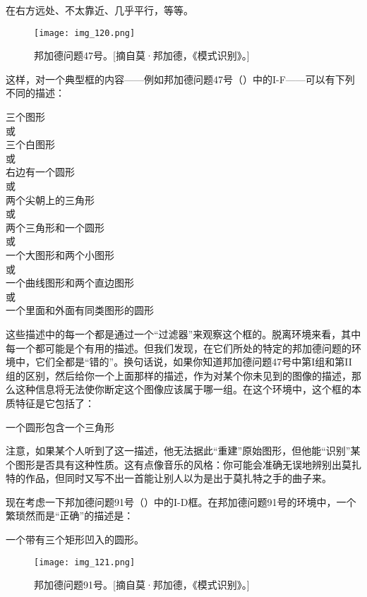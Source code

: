 \begin{block}
在右方远处、不太靠近、几乎平行，等等。
\end{block}

\begin{figure}
\texttt{[image: img\_120.png]}
\caption[邦加德问题47号。]
  {邦加德问题47号。[摘自莫·邦加德，《模式识别》。] }
\end{figure}

这样，对一个典型框的内容——例如邦加德问题47号（）中的I-F——可以有下列不同的描述：
\begin{center}
三个图形\\
或\\
三个白图形\\
或\\
右边有一个圆形\\
或\\
两个尖朝上的三角形\\
或\\
两个三角形和一个圆形\\
或\\
一个大图形和两个小图形\\
或\\
一个曲线图形和两个直边图形\\
或\\
一个里面和外面有同类图形的圆形
\end{center}

这些描述中的每一个都是通过一个“过滤器”来观察这个框的。脱离环境来看，其中每一个都可能是个有用的描述。但我们发现，在它们所处的特定的邦加德问题的环境中，它们全都是“错的”。换句话说，如果你知道邦加德问题47号中第I组和第II组的区别，然后给你一个上面那样的描述，作为对某个你未见到的图像的描述，那么这种信息将无法使你断定这个图像应该属于哪一组。在这个环境中，这个框的本质特征是它包括了：
\begin{block}
一个圆形包含一个三角形
\end{block}

注意，如果某个人听到了这一描述，他无法据此“重建”原始图形，但他能“识别”某个图形是否具有这种性质。这有点像音乐的风格：你可能会准确无误地辨别出莫扎特的作品，但同时又写不出一首能让别人以为是出于莫扎特之手的曲子来。

现在考虑一下邦加德问题91号（）中的I-D框。在邦加德问题91号的环境中，一个繁琐然而是“正确”的描述是：
\begin{center}
一个带有三个矩形凹入的圆形。
\end{center}

\begin{figure}
\texttt{[image: img\_121.png]}
\caption[邦加德问题91号。]
  {邦加德问题91号。[摘自莫·邦加德，《模式识别》。] }
\end{figure}


